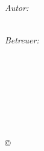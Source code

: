 \begin{titlepage}
\begin{center}
\vspace{0.08\textheight}

\begin{minipage}[t]{0.4\textwidth}
\begin{flushleft} \large
\emph{Autor:}\\
\DenKrTPauthorFirst\ \textsc{\DenKrTPauthorLast}
\end{flushleft}
\end{minipage}
\hfill
\begin{minipage}[t]{0.4\textwidth}
\begin{flushright} \large
\emph{Betreuer:}\\
\begin{addmargin}[0em]{5em}
\DenKrTPsupervisorOneAnrede\\
\end{addmargin}
\DenKrTPsupervisorOneFirst\ \textsc{\DenKrTPsupervisorOneLast}\\
\begin{addmargin}[0em]{5em}
\DenKrTPsupervisorTwoAnrede\\
\end{addmargin}
\DenKrTPsupervisorTwoFirst\ \textsc{\DenKrTPsupervisorTwoLast}
\end{flushright}
\end{minipage}

\vfill

{\large \copyright\ \DenKrTPdate}

\end{center}

\end{titlepage}